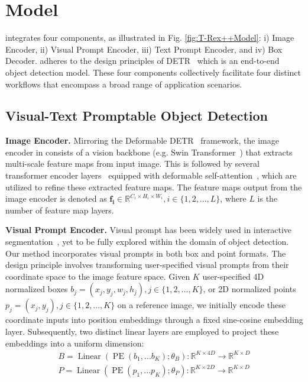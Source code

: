 \section{\ourmodel{} Model}
\ourmodel{} integrates four components, as illustrated in Fig. \ref{fig:T-Rex++Model}: i) Image Encoder, ii) Visual Prompt Encoder, iii) Text Prompt Encoder, and iv) Box Decoder. \ourmodel{} adheres to the design principles of DETR~\cite{carion2020end} which is an end-to-end object detection model. These four components collectively facilitate four distinct workflows that encompass a broad range of application scenarios.


\subsection{Visual-Text Promptable Object Detection}

\noindent\textbf{Image Encoder.} Mirroring the Deformable DETR~\cite{zhu2020deformable} framework, the image encoder in \ourmodel{} consists of a vision backbone (e.g. Swin Transformer~\cite{liu2021swin}) that extracts multi-scale feature maps from input image. This is followed by several transformer encoder layers~\cite{dosovitskiy2020image} equipped with deformable self-attention~\cite{zhu2020deformable}, which are utilized to refine these extracted feature maps. The feature maps output from the image encoder is denoted as $\boldsymbol{f_i} \in \mathbb{R}^{C_i \times H_i \times W_i}, i \in \{1,2,...,L\}$, where $L$ is the number of feature map layers.

\noindent\textbf{Visual Prompt Encoder.} Visual prompt has been widely used in interactive segmentation~\cite{li2023semantic, zou2023segment, kirillov2023segment}, yet to be fully explored within the domain of object detection. Our method incorporates visual prompts in both box and point formats. The design principle involves transforming user-specified visual prompts from their coordinate space to the image feature space.  Given $K$ user-specified 4D normalized boxes $b_j=(x_j,y_j,w_j,h_j), j \in \{1,2,...,K\}$, or 2D normalized points $p_j=(x_j,y_j), j \in \{1,2,...,K\}$ on a reference image, we initially encode these coordinate inputs into position embeddings through a fixed sine-cosine embedding layer. Subsequently, two distinct linear layers are employed to project these embeddings into a uniform dimension:
\begin{gather}
    B = \operatorname{Linear}(\operatorname{PE}(b_1,...b_K); \theta_B) : \mathbb{R}^{K \times 4D} \to \mathbb{R}^{K \times D} \\
    P = \operatorname{Linear}(\operatorname{PE}(p_1,...p_K); \theta_P) : \mathbb{R}^{K \times 2D} \to \mathbb{R}^{K \times D}
\end{gather}


